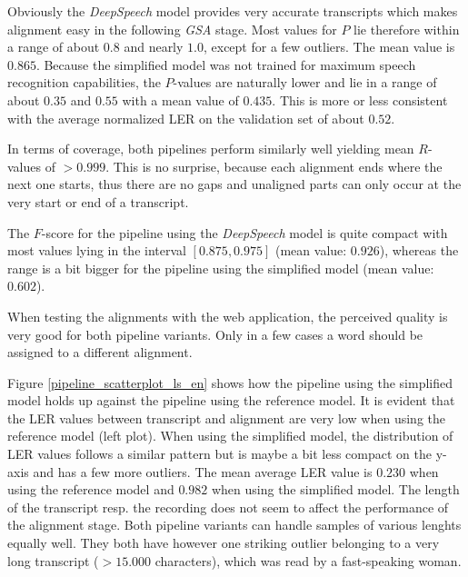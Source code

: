 Obviously the \textit{DeepSpeech} model provides very accurate transcripts which makes alignment easy in the following \textit{\ac{GSA}} stage. Most values for $P$ lie therefore within a range of about $0.8$ and nearly $1.0$, except for a few outliers. The mean value is $0.865$. Because the simplified model was not trained for maximum speech recognition capabilities, the $P$-values are naturally lower and lie in a range of about $0.35$ and $0.55$ with a mean value of $0.435$. This is more or less consistent with the average normalized \ac{LER} on the validation set of about $0.52$.

In terms of coverage, both pipelines perform similarly well yielding mean $R$-values of $>0.999$. This is no surprise, because each alignment ends where the next one starts, thus there are no gaps and unaligned parts can only occur at the very start or end of a transcript. 

The $F$-score for the pipeline using the \textit{DeepSpeech} model is quite compact with most values lying in the interval $[0.875, 0.975]$ (mean value: $0.926$), whereas the range is a bit bigger for the pipeline using the simplified model (mean value: $0.602$).

When testing the alignments with the web application, the perceived quality is very good for both pipeline variants. Only in a few cases a word should be assigned to a different alignment.

Figure \ref{pipeline_scatterplot_ls_en} shows how the pipeline using the simplified model holds up against the pipeline using the reference model. It is evident that the \ac{LER} values between transcript and alignment are very low when using the reference model (left plot). When using the simplified model, the distribution of \ac{LER} values follows a similar pattern but is maybe a bit less compact on the y-axis and has a few more outliers. The mean average \ac{LER} value is $0.230$ when using the reference model and $0.982$ when using the simplified model. The length of the transcript resp. the recording does not seem to affect the performance of the alignment stage. Both pipeline variants can handle samples of various lenghts equally well. They both have however one striking outlier belonging to a very long transcript ($>15.000$ characters), which was read by a fast-speaking woman. 


